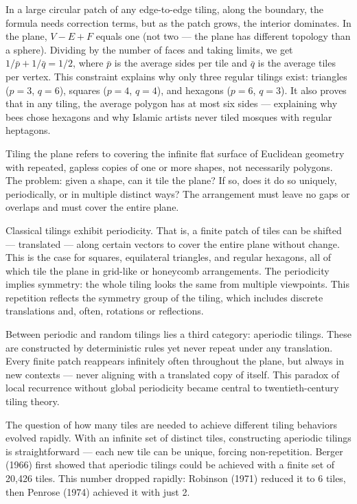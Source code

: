 In a large circular patch of any edge-to-edge tiling, along the boundary, the formula needs correction terms, but as the patch grows, the interior dominates. In the plane, $V - E + F$ equals one (not two — the plane has different topology than a sphere). Dividing by the number of faces and taking limits, we get $1/\bar{p} + 1/\bar{q} = 1/2$, where $\bar{p}$ is the average sides per tile and $\bar{q}$ is the average tiles per vertex. This constraint explains why only three regular tilings exist: triangles ($p=3$, $q=6$), squares ($p=4$, $q=4$), and hexagons ($p=6$, $q=3$). It also proves that in any tiling, the average polygon has at most six sides — explaining why bees chose hexagons and why Islamic artists never tiled mosques with regular heptagons.

Tiling the plane refers to covering the infinite flat surface of Euclidean geometry with repeated, gapless copies of one or more shapes, not necessarily polygons. The problem: given a shape, can it tile the plane? If so, does it do so uniquely, periodically, or in multiple distinct ways? The arrangement must leave no gaps or overlaps and must cover the entire plane.

Classical tilings exhibit periodicity. That is, a finite patch of tiles can be shifted — translated — along certain vectors to cover the entire plane without change. This is the case for squares, equilateral triangles, and regular hexagons, all of which tile the plane in grid-like or honeycomb arrangements. The periodicity implies symmetry: the whole tiling looks the same from multiple viewpoints. This repetition reflects the symmetry group of the tiling, which includes discrete translations and, often, rotations or reflections.

Between periodic and random tilings lies a third category: aperiodic tilings. These are constructed by deterministic rules yet never repeat under any translation. Every finite patch reappears infinitely often throughout the plane, but always in new contexts — never aligning with a translated copy of itself. This paradox of local recurrence without global periodicity became central to twentieth-century tiling theory.

The question of how many tiles are needed to achieve different tiling behaviors evolved rapidly. With an infinite set of distinct tiles, constructing aperiodic tilings is straightforward — each new tile can be unique, forcing non-repetition. Berger (1966) first showed that aperiodic tilings could be achieved with a finite set of 20,426 tiles. This number dropped rapidly: Robinson (1971) reduced it to 6 tiles, then Penrose (1974) achieved it with just 2.

